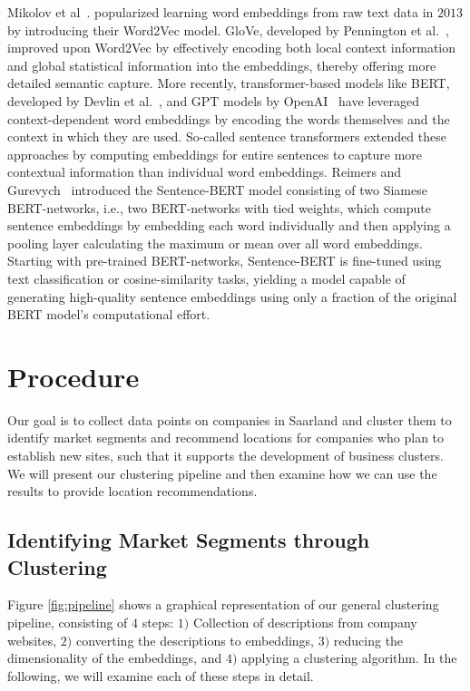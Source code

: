 \documentclass[conference]{IEEEtran}
\begin{document}
Mikolov et al~\cite{mikolov2013efficient}. popularized learning word embeddings from raw text data in $2013$ by introducing their Word2Vec model. GloVe, developed by Pennington et al.~\cite{pennington2014glove}, improved upon Word2Vec by effectively encoding both local context information and global statistical information into the embeddings, thereby offering more detailed semantic capture. More recently, transformer-based models like BERT, developed by Devlin et al.~\cite{devlin2018bert}, and GPT models by OpenAI~\cite{radford2018improving} have leveraged context-dependent word embeddings by encoding the words themselves and the context in which they are used. So-called sentence transformers extended these approaches by computing embeddings for entire sentences to capture more contextual information than individual word embeddings. Reimers and Gurevych~\cite{reimers2019sentence} introduced the Sentence-BERT model consisting of two Siamese BERT-networks, i.e., two BERT-networks with tied weights, which compute sentence embeddings by embedding each word individually and then applying a pooling layer calculating the maximum or mean over all word embeddings. Starting with pre-trained BERT-networks, Sentence-BERT is fine-tuned using text classification or cosine-similarity tasks, yielding a model capable of generating high-quality sentence embeddings using only a fraction of the original BERT model's computational effort.

\section{Procedure}


Our goal is to collect data points on companies in Saarland and cluster them to identify market segments and recommend locations for companies who plan to establish new sites, such that it supports the development of business clusters. We will present our clustering pipeline and then examine how we can use the results to provide location recommendations. 

\subsection{Identifying Market Segments through Clustering}
Figure \ref{fig:pipeline} shows a graphical representation of our general clustering pipeline, consisting of $4$ steps: $1)$ Collection of descriptions from company websites, $2)$ converting the descriptions to embeddings, $3)$ reducing the dimensionality of the embeddings, and $4)$ applying a clustering algorithm. In the following, we will examine each of these steps in detail.
\end{document}
